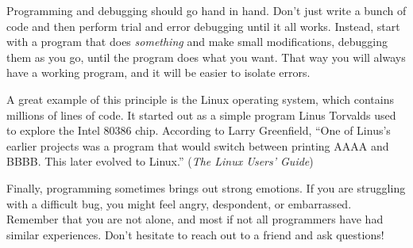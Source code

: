 \documentclass[12pt]{book}
\theoremstyle{exercise}
\begin{document}
Programming and debugging should go hand in hand.
Don't just write a bunch of code and then perform trial and error debugging until it all works.
Instead, start with a program that does {\em something} and make small modifications, debugging them as you go, until the program does what you want.
That way you will always have a working program, and it will be easier to isolate errors.


A great example of this principle is the Linux operating system, which contains millions of lines of code.
It started out as a simple program Linus Torvalds used to explore the Intel 80386 chip.
According to Larry Greenfield, ``One of Linus's earlier projects was a program that would switch between printing AAAA and BBBB.
This later evolved to Linux.'' ({\em The Linux Users' Guide})


Finally, programming sometimes brings out strong emotions.
If you are struggling with a difficult bug, you might feel angry, despondent, or embarrassed.
Remember that you are not alone, and most if not all programmers have had similar experiences.
Don't hesitate to reach out to a friend and ask questions!





\end{document}
